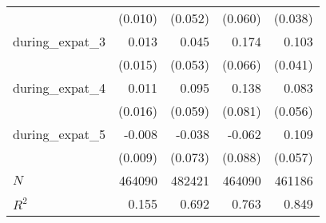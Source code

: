 {\begin{tabular}{l*{4}{D{.}{.}{-1}}}
            &     (0.010)         &     (0.052)         &     (0.060)         &     (0.038)         \\
[1em]
during\_expat\_3&       0.013         &       0.045         &       0.174\sym{***}&       0.103\sym{**} \\
            &     (0.015)         &     (0.053)         &     (0.066)         &     (0.041)         \\
[1em]
during\_expat\_4&       0.011         &       0.095         &       0.138\sym{*}  &       0.083         \\
            &     (0.016)         &     (0.059)         &     (0.081)         &     (0.056)         \\
[1em]
during\_expat\_5&      -0.008         &      -0.038         &      -0.062         &       0.109\sym{*}  \\
            &     (0.009)         &     (0.073)         &     (0.088)         &     (0.057)         \\
\hline
\(N\)       &      464090         &      482421         &      464090         &      461186         \\
\(R^{2}\)   &       0.155         &       0.692         &       0.763         &       0.849         \\
\hline\hline
\end{tabular}
}
